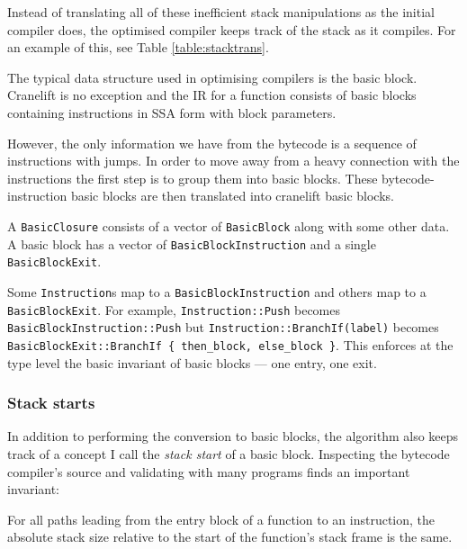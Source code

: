 Instead of translating all of these inefficient stack manipulations as the initial compiler does,
the optimised compiler keeps track of the stack as it compiles. For an example of this, see Table
\ref{table:stacktrans}.

\label{opt-bb}

The typical data structure used in optimising compilers is the basic block. Cranelift is no
exception and the IR for a function consists of basic blocks containing instructions in SSA form
with block parameters.

However, the only information we have from the bytecode is a sequence of instructions with jumps.
In order to move away from a heavy connection with the instructions the first step is to group them
into basic blocks. These bytecode-instruction basic blocks are then translated into cranelift basic
blocks.


A \texttt{BasicClosure} consists of a vector of \texttt{BasicBlock} along with
some other data. A basic block has a vector of \texttt{BasicBlockInstruction} and a single
\texttt{BasicBlockExit}.

Some \texttt{Instruction}s map to a \texttt{BasicBlockInstruction} and others map to a
\texttt{BasicBlockExit}. For example, \texttt{Instruction::Push} becomes
\texttt{BasicBlockInstruction::Push} but \texttt{Instruction::BranchIf(label)} becomes
\texttt{BasicBlockExit::BranchIf \{ then\_block, else\_block \}}. This enforces at the type level
the basic invariant of basic blocks --- one entry, one exit.

\subsubsection{Stack starts}

In addition to performing the conversion to basic blocks, the algorithm also keeps track of a
concept I call the \emph{stack start} of a basic block. Inspecting the bytecode compiler's source
and validating with many programs finds an important invariant:

\begin{framed}
      \noindent
      For all paths leading from the entry block of a function to an instruction, the absolute
      stack size
      relative to the start of the function's stack frame is the same.
\end{framed}

